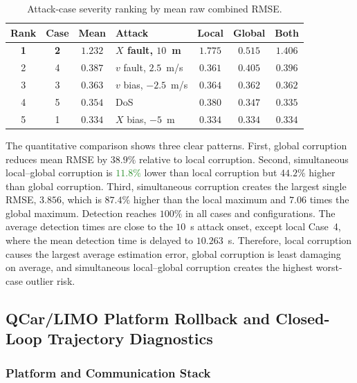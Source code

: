 \documentclass[letterpaper,journal]{IEEEtran}
\newcommand{\azrevcolor}{ForestGreen}
\newcommand{\azrev}[1]{\textcolor{\azrevcolor}{#1}}
\begin{document}
\begin{table}[!t]
\centering
\caption{Attack-case severity ranking by mean raw combined RMSE.}
\label{tab:case_ranking}
\scriptsize
\setlength{\tabcolsep}{0pt}
\renewcommand{\arraystretch}{1.18}
\begin{tabular*}{\columnwidth}{@{\extracolsep{\fill}}ccclccc@{}}
\toprule
\textbf{Rank} & \textbf{Case} & \textbf{Mean} & \textbf{Attack} & \textbf{Local} & \textbf{Global} & \textbf{Both} \\
\midrule
\textbf{1} & \textbf{2} & $\mathbf{1.232}$ & \textbf{$X$ fault, $10$~m} & $\mathbf{1.775}$ & $\mathbf{0.515}$ & $\mathbf{1.406}$ \\
2 & 4 & $0.387$ & $v$ fault, $2.5$~m/s & $0.361$ & $0.405$ & $0.396$ \\
3 & 3 & $0.363$ & $v$ bias, $-2.5$~m/s & $0.364$ & $0.362$ & $0.362$ \\
4 & 5 & $0.354$ & DoS & $0.380$ & $0.347$ & $0.335$ \\
5 & 1 & $0.334$ & $X$ bias, $-5$~m & $0.334$ & $0.334$ & $0.334$ \\
\bottomrule
\end{tabular*}
\end{table}

The quantitative comparison shows three clear patterns. First, global corruption reduces mean RMSE by $38.9\%$ relative to local corruption. Second, simultaneous local--global corruption is \azrev{$11.8\%$} lower than local corruption but $44.2\%$ higher than global corruption. Third, simultaneous corruption creates the largest single RMSE, $3.856$, which is $87.4\%$ higher than the local maximum and $7.06$ times the global maximum. Detection reaches $100\%$ in all cases and configurations. The average detection times are close to the $10$~s attack onset, except local Case~4, where the mean detection time is delayed to $10.263$~s. Therefore, local corruption causes the largest average estimation error, global corruption is least damaging on average, and simultaneous local--global corruption creates the highest worst-case outlier risk.

\subsection{QCar/LIMO Platform Rollback and Closed-Loop Trajectory Diagnostics}\label{sec:qcar_limo_platform}

\subsubsection{Platform and Communication Stack}
\end{document}
